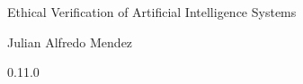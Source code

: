 \documentclass[12pt,a4paper]{book}
\begin{document}
    \begin{center}

        \phantom{H}

        \vspace{80mm}

        {\huge{Ethical Verification of Artificial Intelligence Systems}}

        \vspace{80mm}
        Julian Alfredo Mendez

        \vspace{10mm}
        0.11.0

    \end{center}

    \newpage

    \tableofcontents

    
    

    
    
    

    \appendix
    
    

    
    
\end{document}
